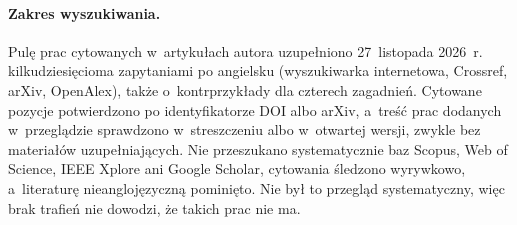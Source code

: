 \paragraph{Zakres wyszukiwania.}
Pulę prac cytowanych w~artykułach autora uzupełniono 27~listopada 2026~r. kilkudziesięcioma zapytaniami po angielsku (wyszukiwarka internetowa, Crossref, arXiv, OpenAlex), także o~kontrprzykłady dla czterech zagadnień.
Cytowane pozycje potwierdzono po identyfikatorze DOI albo arXiv, a~treść prac dodanych w~przeglądzie sprawdzono w~streszczeniu albo w~otwartej wersji, zwykle bez materiałów uzupełniających.
Nie przeszukano systematycznie baz Scopus, Web of Science, IEEE Xplore ani Google Scholar, cytowania śledzono wyrywkowo, a~literaturę nieanglojęzyczną pominięto.
Nie był to przegląd systematyczny, więc brak trafień nie dowodzi, że takich prac nie ma.
